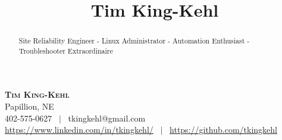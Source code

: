\documentclass[10pt, a4paper]{article}
\title{\textbf{Tim King-Kehl}}
\date{}
\begin{document}
\begin{center}
    \textbf{\Huge \scshape Tim King-Kehl} \\ \vspace{1pt}
    Papillion, NE \\ \vspace{1pt}
     402-575-0627 \ $|$ \ tkingkehl@gmail.com \\ \vspace{1pt} 
     \url{https://www.linkedin.com/in/tkingkehl/} \ $|$ \ \url{https://github.com/tkingkehl} \\ \vspace{1pt} 
\end{center}
\begin{abstract}
Site Reliability Engineer - Linux Administrator - Automation Enthusiast - Troubleshooter Extraordinaire
\end{abstract}
\end{document}
